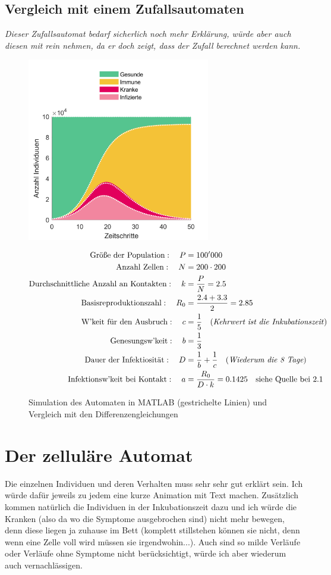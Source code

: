 \documentclass[11pt,a4paper]{article}
\begin{document}
\subsection{Vergleich mit einem Zufallsautomaten}
\textit{Dieser Zufallsautomat bedarf sicherlich noch mehr Erklärung, würde aber auch diesen mit rein nehmen, da er doch zeigt, dass der Zufall berechnet werden kann.}
\begin{figure}[h]
  	\centering
 	\includegraphics[width=8cm]{diff_vs_randomauto.png}
  	\caption{Simulation des Automaten in MATLAB (gestrichelte Linien) und Vergleich mit den Differenzengleichungen}
  	\begin{align*}
  		\textrm{Größe der Population}:\quad
  		P &= 100'000\\
  		\textrm{Anzahl Zellen}:\quad
  		N &= 200 \cdot 200\\
  		\textrm{Durchschnittliche Anzahl an Kontakten}:\quad
  		k &= \frac{P}{N} = 2.5\\
  		\textrm{Basisreproduktionszahl}:\quad
  		R_0 &= \frac{2.4 + 3.3}{2} = 2.85\\
  		\textrm{W'keit für den Ausbruch}:\quad
  		c &= \frac{1}{5} \quad
  		\textrm{(\textit{Kehrwert ist die Inkubationszeit})}\\
  		\textrm{Genesungsw'keit}:\quad
  		b &= \frac{1}{3}\\
  		\textrm{Dauer der Infektiosität}:\quad
  		D &= \frac{1}{b} + \frac{1}{c}\quad
  		(\textit{Wiederum die 8 Tage})\\
  		\textrm{Infektionsw'keit bei Kontakt}:\quad
  		a &= \frac{R_0}{D \cdot k} = 0.1425\quad
  		\textrm{siehe Quelle bei 2.1}
  	\end{align*}
\end{figure}

\newpage
\section{Der zelluläre Automat}
Die einzelnen Individuen und deren Verhalten muss sehr sehr gut erklärt sein. Ich würde dafür jeweils zu jedem eine kurze Animation mit Text machen. Zusätzlich kommen natürlich die Individuen in der Inkubationszeit dazu und ich würde die Kranken (also da wo die Symptome ausgebrochen sind) nicht mehr bewegen, denn diese liegen ja zuhause im Bett (komplett stillstehen können sie nicht, denn wenn eine Zelle voll wird müssen sie irgendwohin...). Auch sind so milde Verläufe oder Verläufe ohne Symptome nicht berücksichtigt, würde ich aber wiederum auch vernachlässigen.
\end{document}
